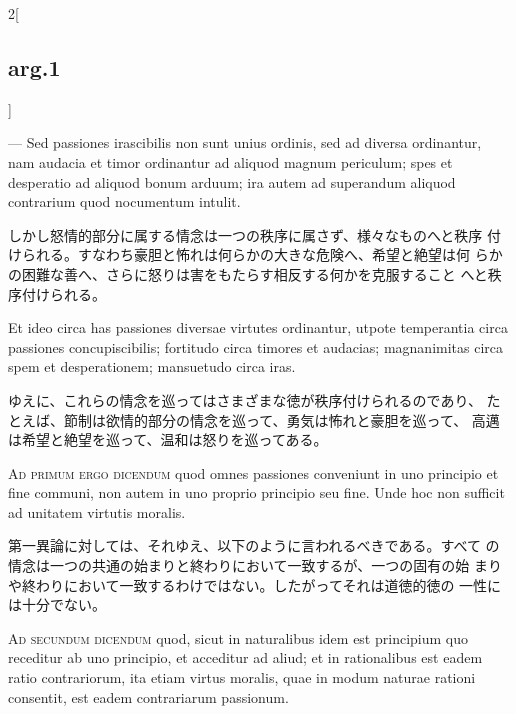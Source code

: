 \documentclass[paper=a4paper,fontsize=10pt,jafontsize=9pt,titlepage]{jlreq}
\begin{document}
\begin{paracol}{2}[\subsection{arg.1}]
\switchcolumn*

--- Sed passiones irascibilis non sunt unius ordinis, sed ad diversa
 ordinantur, nam audacia et timor ordinantur ad aliquod magnum
 periculum; spes et desperatio ad aliquod bonum arduum; ira autem ad
 superandum aliquod contrarium quod nocumentum intulit.

\switchcolumn

しかし怒情的部分に属する情念は一つの秩序に属さず、様々なものへと秩序
 付けられる。すなわち豪胆と怖れは何らかの大きな危険へ、希望と絶望は何
 らかの困難な善へ、さらに怒りは害をもたらす相反する何かを克服すること
 へと秩序付けられる。

\switchcolumn*

Et ideo circa
 has passiones diversae virtutes ordinantur, utpote temperantia circa
 passiones concupiscibilis; fortitudo circa timores et audacias;
 magnanimitas circa spem et desperationem; mansuetudo circa iras.

\switchcolumn

ゆえに、これらの情念を巡ってはさまざまな徳が秩序付けられるのであり、
 たとえば、節制は欲情的部分の情念を巡って、勇気は怖れと豪胆を巡って、
 高邁は希望と絶望を巡って、温和は怒りを巡ってある。

\switchcolumn*[\subsection{ad.1}]

{\scshape Ad primum ergo dicendum} quod omnes passiones conveniunt in
 uno principio et fine communi, non autem in uno proprio principio seu
 fine. Unde hoc non sufficit ad unitatem virtutis moralis.

\switchcolumn

第一異論に対しては、それゆえ、以下のように言われるべきである。すべて
 の情念は一つの共通の始まりと終わりにおいて一致するが、一つの固有の始
 まりや終わりにおいて一致するわけではない。したがってそれは道徳的徳の
 一性には十分でない。

\switchcolumn*[\subsection{ad.2}]

{\scshape Ad secundum dicendum} quod, sicut in naturalibus idem est
 principium quo receditur ab uno principio, et acceditur ad aliud; et
 in rationalibus est eadem ratio contrariorum, ita etiam virtus
 moralis, quae in modum naturae rationi consentit, est eadem
 contrariarum passionum.


\end{paracol}
\end{document}
